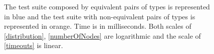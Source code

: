  
\begin{figure}[t]
  
\caption{The test suite composed by equivalent pairs of types is represented in blue and the
  test suite with non-equivalent pairs of types is represented in orange. Time is in
  milliseconds. Both scales of \ref{distribution}, \ref{numberOfNodes} are logarithmic and
  the scale of \ref{timeouts} is linear.}
\label{fig:results}
\end{figure}

